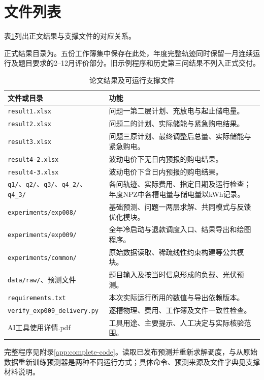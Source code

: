 \section{文件列表}
表\ref{tab:文件列表}列出正文结果与支撑文件的对应关系。

正式结果目录为。五份工作簿集中保存在此处，年度完整轨迹同时保留一月连续运行及题目要求的2--12月评价部分。旧示例程序和历史第三问结果不列入正式交付。
\begin{table}[H]\centering\small
\caption{论文结果及可运行支撑文件}\label{tab:文件列表}
\begin{tabularx}{\textwidth}{>{\raggedright\arraybackslash}p{4.5cm}X}\toprule
文件或目录 & 功能\\\midrule
\texttt{result1.xlsx} & 问题一第二层计划、充放电与起止储电量。\\
\texttt{result2.xlsx} & 问题二的计划、实际储能与紧急购电结果。\\
\texttt{result3.xlsx} & 问题三原计划、最终调整后总量、实际储能与紧急购电。\\
\texttt{result4-2.xlsx} & 波动电价下无日内预报的购电结果。\\
\texttt{result4-3.xlsx} & 波动电价下含日内预报的购电结果。\\
\texttt{q1/}、\texttt{q2/}、\texttt{q3/}、\texttt{q4\_2/}、\texttt{q4\_3/} & 各问轨迹、实际费用、指定日期及运行检查；年度NPZ中各槽电量与储电量以kWh记录。\\
\nolinkurl{experiments/exp008/} & 基础预测、问题一两层求解、共同模式与反馈优化模块。\\
\nolinkurl{experiments/exp009/} & 全年冷启动与退款调度入口、结果导出和绘图程序。\\
\nolinkurl{experiments/common/} & 原始数据读取、稀疏线性约束构建等公共模块。\\
\nolinkurl{data/raw/}、预测文件 & 题目输入及按当时信息形成的负载、光伏预测。\\
\texttt{requirements.txt} & 本次实际运行所用的数值与导出依赖版本。\\
\nolinkurl{verify_exp009_delivery.py} & 逐槽物理、费用、工作簿及文件一致性检查。\\
AI工具使用详情.pdf & 工具用途、主要提示、人工决定与实际核验范围。\\\bottomrule
\end{tabularx}\end{table}
完整程序见附录\ref{app:complete-code}。读取已发布预测并重新求解调度，与从原始数据重新训练预测器是两种不同运行方式；具体命令、预测来源及文件字典见支撑材料说明。
